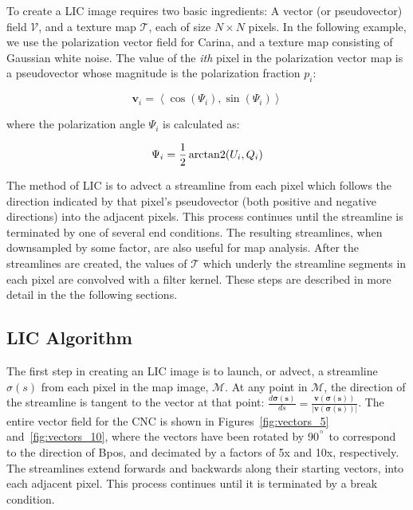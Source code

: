 To create a LIC image requires two basic ingredients: A vector (or pseudovector) field $\boldsymbol{\mathcal{V}}$, and a texture map $\mathcal{T}$, each of size $N \times N$ pixels. In the following example, we use the polarization vector field for Carina, and a texture map consisting of Gaussian white noise. The value of the \textit{ith} pixel in the polarization vector map is a pseudovector whose magnitude is the polarization fraction $p_{i}$:

\begin{equation}\label{eq:pol vector}
  \boldsymbol{v}_{i} = \left< \mathrm{\cos}(\Psi_{i}), \mathrm{\sin}(
  \Psi_{i}) \right>
\end{equation}

where the polarization angle $\Psi_{i}$ is calculated as:

\begin{equation}\label{eq:pol angle 2}
  \Psi_{i} = \frac{1}{2}\operatorname{arctan2}(U_{i}, Q_{i})
\end{equation}

The method of LIC is to advect a streamline from each pixel which follows the direction indicated by that pixel's pseudovector (both positive and negative directions) into the adjacent pixels. This process continues until the streamline is terminated by one of several end conditions. The resulting streamlines, when downsampled by some factor, are also useful for map analysis. After the streamlines are created, the values of $\mathcal{T}$ which underly the streamline segments in each pixel are convolved with a filter kernel. These steps are described in more detail in the the following sections.

\subsection{LIC Algorithm}

The first step in creating an LIC image is to launch, or advect, a streamline $\sigma(s)$ from each pixel in the map image, $\mathcal{M}$. At any point in $\mathcal{M}$, the direction of the streamline is tangent to the vector at that point: $\frac{ d\boldsymbol{\sigma(s)}}{ds} = \boldsymbol{ \frac{ v(\sigma(s)) }{\lvert v(\sigma(s)) \rvert} }$. The entire vector field for the CNC is shown in Figures~\ref{fig:vectors_5} and~\ref{fig:vectors_10}, where the vectors have been rotated by 90$^{\degree}$ to correspond to the direction of \gls{Bpos}, and decimated by a factors of 5x and 10x, respectively. The streamlines extend forwards and backwards along their starting vectors, into each adjacent pixel. This process continues until it is terminated by a break condition.

